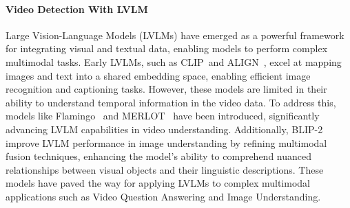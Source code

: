 
\paragraph{\textbf{Video Detection With LVLM}}
Large Vision-Language Models (LVLMs) have emerged as a powerful framework for integrating visual and textual data, enabling models to perform complex multimodal tasks. Early LVLMs, such as CLIP~\cite{radford2021learningtransferablevisualmodels}and ALIGN~\cite{jia2021scalingvisualvisionlanguagerepresentation}, excel at mapping images and text into a shared embedding space, enabling efficient image recognition and captioning tasks. However, these models are limited in their ability to understand temporal information in the video data. To address this, models like Flamingo~\cite{alayrac2022flamingovisuallanguagemodel} and MERLOT~\cite{zellers2021merlotmultimodalneuralscript} have been introduced, significantly advancing LVLM capabilities in video understanding. Additionally, BLIP-2~\cite{li2023blip2bootstrappinglanguageimagepretraining} improve LVLM performance in image understanding by refining multimodal fusion techniques, enhancing the model's ability to comprehend nuanced relationships between visual objects and their linguistic descriptions. These models have paved the way for applying LVLMs to complex multimodal applications such as Video Question Answering and Image Understanding.

